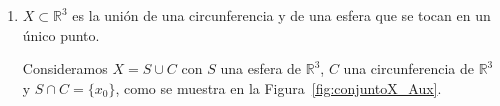 \begin{ejercicio}
\begin{enumerate}[label=\alph*)]

        \item \label{item:circ_esfera}
        $X\subset \mathbb{R}^3$ es la unión de una circunferencia y de una esfera que se tocan en un único punto.

            Consideramos $X = S\cup C$ con $S$ una esfera de $\mathbb{R}^3$, $C$ una circunferencia de $\mathbb{R}^3$ y $S\cap C = \{x_0\}$, como se muestra en la Figura~\ref{fig:conjuntoX_Aux}.
            \begin{figure}[h]
                \centering
\end{figure}
\end{enumerate}
\end{ejercicio}
